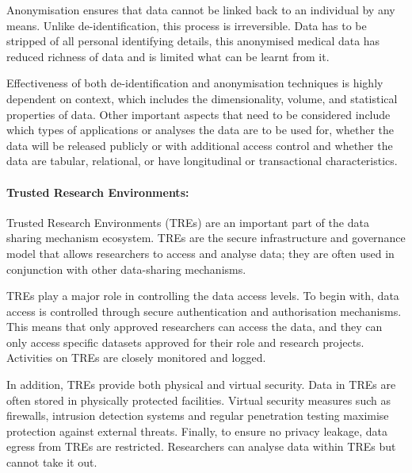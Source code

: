 \documentclass[11pt]{article}
\begin{document}
Anonymisation ensures that data cannot be linked back to an individual by any means. Unlike de-identification, this process is irreversible. Data has to be stripped of all personal identifying details, this anonymised medical data has reduced richness of data and is limited what can be learnt from it. 


Effectiveness of both de-identification and anonymisation techniques is highly dependent on context, which includes the dimensionality, volume, and statistical properties of data. Other important aspects that need to be considered include which types of applications or analyses the data are to be used for, whether the data will be released publicly or with additional access control and whether the data are tabular, relational, or have longitudinal or transactional characteristics.

\paragraph{Trusted Research Environments:}

Trusted Research Environments (TREs) are an important part of the data sharing mechanism ecosystem. TREs are the secure infrastructure and governance model that allows researchers to access and analyse data; they are often used in conjunction with other data-sharing mechanisms.

TREs play a major role in controlling the data access levels. To begin with, data access is controlled through secure authentication and authorisation mechanisms. This means that only approved researchers can access the data, and they can only access specific datasets approved for their role and research projects. Activities on TREs are closely monitored and logged.

In addition, TREs provide both physical and virtual security. Data in TREs are often stored in physically protected facilities. Virtual security measures such as firewalls, intrusion detection systems and regular penetration testing maximise protection against external threats.  Finally, to ensure no privacy leakage, data egress from TREs are restricted. Researchers can analyse data within TREs but cannot take it out.
\end{document}
